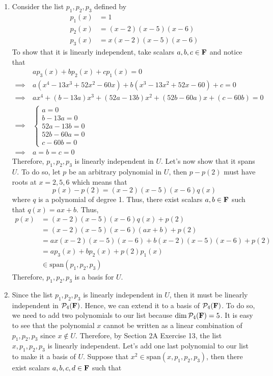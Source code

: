 \begin{solution}
    \begin{enumerate}[label=(\alph*)]
        \item Consider the list $p_1, p_2, p_3$ defined by
        \begin{align*}
            p_1(x) &= 1 \\
            p_2(x) &= (x-2)(x-5)(x-6) \\
            p_3(x) &= x(x-2)(x-5)(x-6)
        \end{align*}
        To show that it is linearly independent, take scalars $a,b,c \in \mathbf{F}$ and notice that
        \begin{align*}
            &ap_3(x) + bp_2(x) + cp_1(x) = 0 \\
            \implies \ & a(x^4-13x^3+52x^2-60x)  + b(x^3-13x^2+52x-60) + c = 0\\ 
            \implies \ & ax^4 + (b - 13a)x^3 + (52a-13b)x^2 + (52b - 60a)x + (c-60b) = 0 \\
            \implies \ & \begin{cases}
                a=0 \\ b - 13a = 0 \\ 52a-13b = 0 \\ 52b - 60a = 0 \\ c-60b = 0
            \end{cases} \\
            \implies \ & a=b=c=0
        \end{align*}
        Therefore, $p_1, p_2, p_3$ is linearly independent in $U$. Let's now show that it spans $U$. To do so, let $p$ be an arbitrary polynomial in $U$, then $p - p(2)$ must have roots at $x=2,5,6$ which means that
        $$p(x) - p(2)= (x-2)(x-5)(x-6)q(x)$$
        where $q$ is a polynomial of degree 1. Thus, there exist scalars $a,b \in \mathbf{F}$ such that $q(x) = ax+b$. Thus,
        \begin{align*}
            p(x) &= (x-2)(x-5)(x-6)q(x) + p(2) \\
            &= (x-2)(x-5)(x-6)(ax+b) + p(2) \\
            &= ax(x-2)(x-5)(x-6) + b(x-2)(x-5)(x-6) + p(2) \\
            &= ap_3(x) + bp_2(x) + p(2)p_1(x) \\
            &\in \text{span}(p_1, p_2, p_3)
        \end{align*}
        Therefore, $p_1, p_2, p_3$ is a basis for $U$.
        \item Since the list $p_1, p_2, p_3$ is linearly independent in $U$, then it must be linearly independent in $\mathcal{P}_4(\mathbf{F})$. Hence, we can extend it to a basis of $\mathcal{P}_4(\mathbf{F})$. To do so, we need to add two polynomials to our list because $\dim \mathcal{P}_4(\mathbf{F}) = 5$. It is easy to see that the polynomial $x$ cannot be written as a linear combination of $p_1, p_2, p_3$ since $x \notin U$. Therefore, by Section 2A Exercise 13, the list $x, p_1, p_2, p_3$ is linearly independent. Let's add one last polynomial to our list to make it a basis of $U$. Suppose that $x^2 \in \text{span}(x, p_1, p_2, p_3)$, then there exist scalars $a,b,c,d \in \mathbf{F}$ such that

\end{enumerate}
\end{solution}
